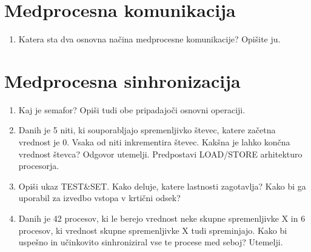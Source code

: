 \documentclass{book}
\begin{document}
\section{Medprocesna komunikacija}
\begin{enumerate}
    \item Katera sta dva osnovna načina medprocesne komunikacije? Opišite ju.
\end{enumerate}

\section{Medprocesna sinhronizacija}
\begin{enumerate}
    \item Kaj je semafor? Opiši tudi obe pripadajoči osnovni operaciji.
    \item Danih je 5 niti, ki souporabljajo spremenljivko števec, katere začetna vrednost je 0. Vsaka od niti inkrementira števec. Kakšna je lahko končna vrednost števca? Odgovor utemelji. Predpostavi LOAD/STORE arhitekturo procesorja.
    \item Opiši ukaz TEST\&SET. Kako deluje, katere lastnosti zagotavlja? Kako bi ga uporabil za izvedbo vstopa v krtični odsek?
    \item Danih je 42 procesov, ki le berejo vrednost neke skupne spremenljivke X in 6 procesov, ki vrednost skupne spremenljivke X tudi spreminjajo. Kako bi uspešno in učinkovito sinhroniziral vse te procese med seboj? Utemelji.
\end{enumerate}
\end{document}
